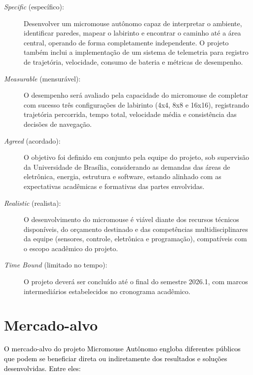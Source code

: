 \begin{description}
    \item[\textit{Specific} (específico):] Desenvolver um micromouse autônomo capaz de interpretar o ambiente, identificar paredes, mapear o labirinto e encontrar o caminho até a área central, operando de forma completamente independente. O projeto também inclui a implementação de um sistema de telemetria para registro de trajetória, velocidade, consumo de bateria e métricas de desempenho.
    
    \item[\textit{Measurable} (mensurável):] O desempenho será avaliado pela capacidade do micromouse de completar com sucesso três configurações de labirinto (4x4, 8x8 e 16x16), registrando trajetória percorrida, tempo total, velocidade média e consistência das decisões de navegação.
    
    \item[\textit{Agreed} (acordado):] O objetivo foi definido em conjunto pela equipe do projeto, sob supervisão da Universidade de Brasília, considerando as demandas das áreas de eletrônica, energia, estrutura e software, estando alinhado com as expectativas acadêmicas e formativas das partes envolvidas.
    
    \item[\textit{Realistic} (realista):] O desenvolvimento do micromouse é viável diante dos recursos técnicos disponíveis, do orçamento destinado e das competências multidisciplinares da equipe (sensores, controle, eletrônica e programação), compatíveis com o escopo acadêmico do projeto.
    
    \item[\textit{Time Bound} (limitado no tempo):] O projeto deverá ser concluído até o final do semestre 2026.1, com marcos intermediários estabelecidos no cronograma acadêmico.
\end{description}

\section{Mercado-alvo}

\textcolor{black}{
O mercado-alvo do projeto Micromouse Autônomo engloba diferentes públicos que podem se beneficiar direta ou indiretamente dos resultados e soluções desenvolvidas. Entre eles:
}

